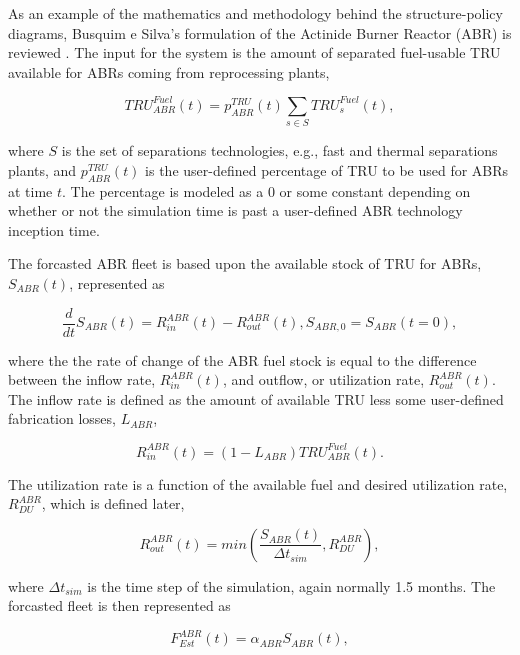 As an example of the mathematics and methodology behind the structure-policy
diagrams, Busquim e Silva's formulation of the Actinide Burner Reactor (ABR) is
reviewed \cite{busquim_e_silva_system_2008}. The input for the system is the
amount of separated fuel-usable TRU available for ABRs coming from reprocessing
plants,

\begin{equation}\label{eqn:tru}
 TRU^{Fuel}_{ABR}(t) = p^{TRU}_{ABR}(t) \sum_{s \in S} TRU^{Fuel}_s(t),
\end{equation}

where $S$ is the set of separations technologies, e.g., fast and thermal
separations plants, and $p^{TRU}_{ABR}(t)$ is the user-defined percentage of TRU
to be used for ABRs at time $t$. The percentage is modeled as a 0 or some
constant depending on whether or not the simulation time is past a user-defined
ABR technology inception time. 

The forcasted ABR fleet is based upon the available stock of TRU for ABRs,
$S_{ABR}(t)$, represented as

\begin{equation}
 \frac{d}{dt}S_{ABR}(t) = R_{in}^{ABR}(t) - R_{out}^{ABR}(t), S_{ABR,0} = S_{ABR}(t=0),
\end{equation}

where the the rate of change of the ABR fuel stock is equal to the difference
between the inflow rate, $R_{in}^{ABR}(t)$, and outflow, or utilization rate,
$R_{out}^{ABR}(t)$. The inflow rate is defined as the amount of available TRU
less some user-defined fabrication losses, $L_{ABR}$,

\begin{equation}
 R_{in}^{ABR}(t) = \left( 1 - L_{ABR} \right) TRU^{Fuel}_{ABR}(t).
\end{equation}

The utilization rate is a function of the available fuel and desired utilization
rate, $R^{ABR}_{DU}$, which is defined later,

\begin{equation}
 R_{out}^{ABR}(t) = min \left( \frac{S_{ABR}(t)}{\Delta t_{sim}}, R^{ABR}_{DU}\right),
\end{equation}

where $\Delta t_{sim}$ is the time step of the simulation, again normally 1.5
months. The forcasted fleet is then represented as

\begin{equation}
 F_{Est}^{ABR}(t) = \alpha_{ABR} S_{ABR}(t),
\end{equation}

